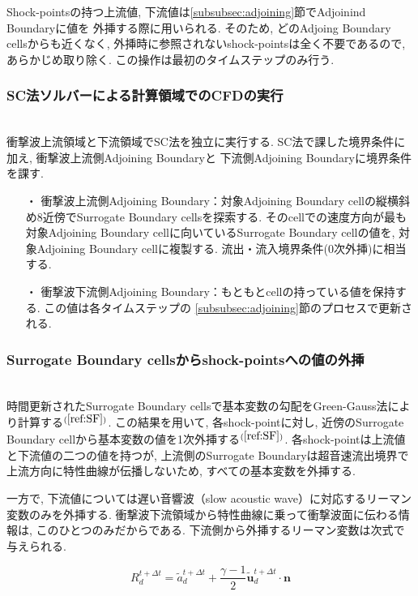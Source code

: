\documentclass[a4j]{jarticle}
\begin{document}
Shock-pointsの持つ上流値, 下流値は\ref{subsubsec:adjoining}節でAdjoinind Boundaryに値を
外挿する際に用いられる. そのため, どのAdjoing Boundary cellsからも近くなく, 外挿時に参照されないshock-pointsは全く不要であるので,
あらかじめ取り除く. この操作は最初のタイムステップのみ行う.

\subsubsection{SC法ソルバーによる計算領域でのCFDの実行} \label{subsubsec:sc}
\mbox{}\\[-1.0ex]
衝撃波上流領域と下流領域でSC法を独立に実行する. SC法で課した境界条件に加え, 衝撃波上流側Adjoining Boundaryと
下流側Adjoining Boundaryに境界条件を課す.
\begin{itemize}
  \item[・]  衝撃波上流側Adjoining Boundary：対象Adjoining Boundary cellの縦横斜め8近傍でSurrogate Boundary cellsを探索する. 
            そのcellでの速度方向が最も対象Adjoining Boundary cellに向いているSurrogate Boundary cellの値を, 対象Adjoining Boundary cellに複製する. 流出・流入境界条件(0次外挿)に相当する.
  \item[・]  衝撃波下流側Adjoining Boundary：もともとcellの持っている値を保持する. この値は各タイムステップの
            \ref{subsubsec:adjoining}節のプロセスで更新される.
\end{itemize}

\subsubsection{Surrogate Boundary cellsからshock-pointsへの値の外挿} \label{subsubsec:extrapolate}
\mbox{}\\[-1.0ex]

時間更新されたSurrogate Boundary cellsで基本変数の勾配をGreen-Gauss法により計算する$^{(\ref{ref:SF})}$.
この結果を用いて, 各shock-pointに対し, 近傍のSurrogate Boundary cellから基本変数の値を1次外挿する$^{(\ref{ref:SF})}$.
各shock-pointは上流値と下流値の二つの値を持つが,
上流側のSurrogate Boundaryは超音速流出境界で上流方向に特性曲線が伝播しないため, 
すべての基本変数を外挿する.

一方で, 下流値については遅い音響波（slow acoustic wave）に対応するリーマン変数のみを外挿する.
衝撃波下流領域から特性曲線に乗って衝撃波面に伝わる情報は, このひとつのみだからである.
下流側から外挿するリーマン変数は次式で与えられる.

\begin{equation}
    R_d^{t+\Delta t} = \tilde{a}_d^{t+\Delta t} + \frac{\gamma - 1}{2}\tilde{\mathbf{u}}_d^{t+\Delta t} \cdot \mathbf{n}
    \label{eq:Riemann_down}
\end{equation}
\end{document}
